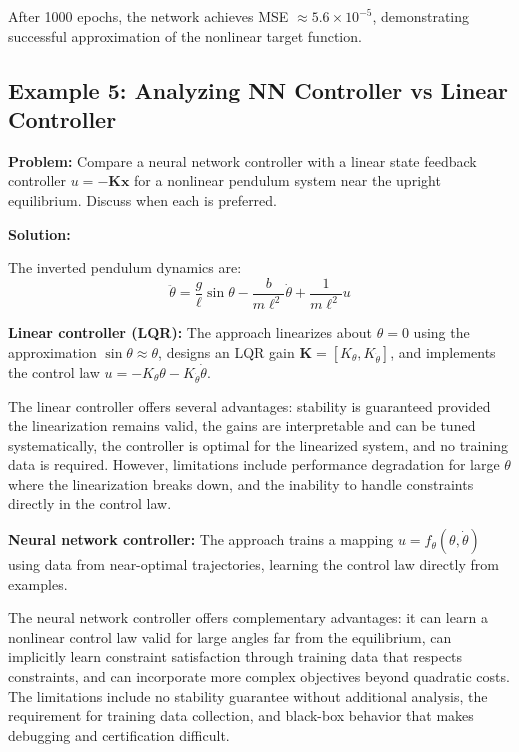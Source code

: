 After 1000 epochs, the network achieves MSE $\approx 5.6 \times 10^{-5}$, demonstrating successful approximation of the nonlinear target function.

\hrulefill

\subsection{Example 5: Analyzing NN Controller vs Linear Controller}

\textbf{Problem:} Compare a neural network controller with a linear state feedback controller $u = -\mathbf{K}\mathbf{x}$ for a nonlinear pendulum system near the upright equilibrium. Discuss when each is preferred.

\textbf{Solution:}

The inverted pendulum dynamics are:
\begin{equation}
\ddot{\theta} = \frac{g}{\ell}\sin\theta - \frac{b}{m\ell^2}\dot{\theta} + \frac{1}{m\ell^2}u
\end{equation}

\textbf{Linear controller (LQR):} The approach linearizes about $\theta = 0$ using the approximation $\sin\theta \approx \theta$, designs an LQR gain $\mathbf{K} = [K_\theta, K_{\dot{\theta}}]$, and implements the control law $u = -K_\theta\theta - K_{\dot{\theta}}\dot{\theta}$.

The linear controller offers several advantages: stability is guaranteed provided the linearization remains valid, the gains are interpretable and can be tuned systematically, the controller is optimal for the linearized system, and no training data is required. However, limitations include performance degradation for large $\theta$ where the linearization breaks down, and the inability to handle constraints directly in the control law.

\textbf{Neural network controller:} The approach trains a mapping $u = f_\theta(\theta, \dot{\theta})$ using data from near-optimal trajectories, learning the control law directly from examples.

The neural network controller offers complementary advantages: it can learn a nonlinear control law valid for large angles far from the equilibrium, can implicitly learn constraint satisfaction through training data that respects constraints, and can incorporate more complex objectives beyond quadratic costs. The limitations include no stability guarantee without additional analysis, the requirement for training data collection, and black-box behavior that makes debugging and certification difficult.

